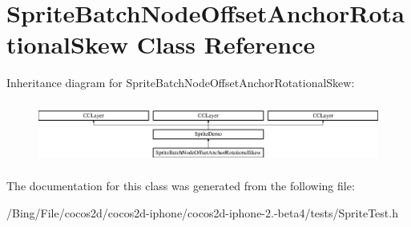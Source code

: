 \hypertarget{interface_sprite_batch_node_offset_anchor_rotational_skew}{\section{Sprite\-Batch\-Node\-Offset\-Anchor\-Rotational\-Skew Class Reference}
\label{interface_sprite_batch_node_offset_anchor_rotational_skew}
}
Inheritance diagram for Sprite\-Batch\-Node\-Offset\-Anchor\-Rotational\-Skew\-:\begin{figure}[H]
\begin{center}
\leavevmode
\includegraphics[height=2.028986cm]{interface_sprite_batch_node_offset_anchor_rotational_skew}
\end{center}
\end{figure}


The documentation for this class was generated from the following file\-:\begin{DoxyCompactItemize}
\item 
/\-Bing/\-File/cocos2d/cocos2d-\/iphone/cocos2d-\/iphone-\/2.-\/beta4/tests/Sprite\-Test.\-h\end{DoxyCompactItemize}

